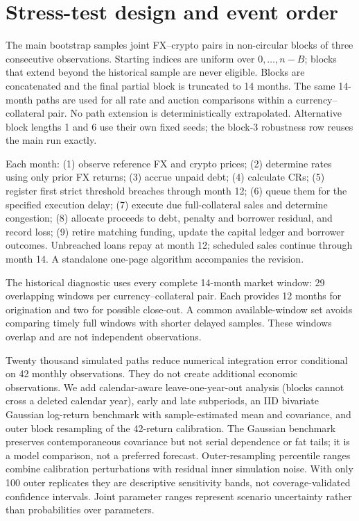 \documentclass[11pt,a4paper]{article}
\begin{document}
\section{Stress-test design and event order}
The main bootstrap samples joint FX--crypto pairs in non-circular blocks of three consecutive observations. Starting indices are uniform over $0,\ldots,n-B$; blocks that extend beyond the historical sample are never eligible. Blocks are concatenated and the final partial block is truncated to 14 months. The same 14-month paths are used for all rate and auction comparisons within a currency--collateral pair. No path extension is deterministically extrapolated. Alternative block lengths 1 and 6 use their own fixed seeds; the block-3 robustness row reuses the main run exactly.

Each month: (1) observe reference FX and crypto prices; (2) determine rates using only prior FX returns; (3) accrue unpaid debt; (4) calculate CRs; (5) register first strict threshold breaches through month 12; (6) queue them for the specified execution delay; (7) execute due full-collateral sales and determine congestion; (8) allocate proceeds to debt, penalty and borrower residual, and record loss; (9) retire matching funding, update the capital ledger and borrower outcomes. Unbreached loans repay at month 12; scheduled sales continue through month 14. A standalone one-page algorithm accompanies the revision.

The historical diagnostic uses every complete 14-month market window: 29 overlapping windows per currency--collateral pair. Each provides 12 months for origination and two for possible close-out. A common available-window set avoids comparing timely full windows with shorter delayed samples. These windows overlap and are not independent observations.

Twenty thousand simulated paths reduce numerical integration error conditional on 42 monthly observations. They do not create additional economic observations. We add calendar-aware leave-one-year-out analysis (blocks cannot cross a deleted calendar year), early and late subperiods, an IID bivariate Gaussian log-return benchmark with sample-estimated mean and covariance, and outer block resampling of the 42-return calibration. The Gaussian benchmark preserves contemporaneous covariance but not serial dependence or fat tails; it is a model comparison, not a preferred forecast. Outer-resampling percentile ranges combine calibration perturbations with residual inner simulation noise. With only 100 outer replicates they are descriptive sensitivity bands, not coverage-validated confidence intervals. Joint parameter ranges represent scenario uncertainty rather than probabilities over parameters.
\end{document}
